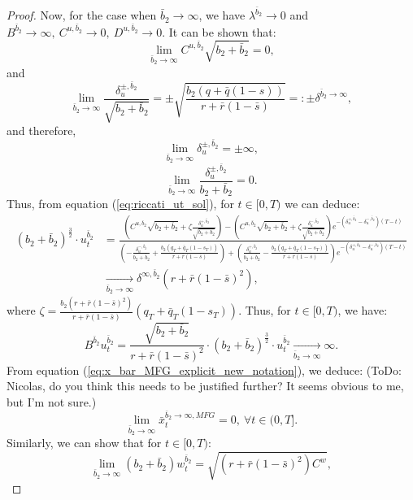 \documentclass[11pt]{article}
\begin{document}
\begin{proof}
	Now, for the case when $\bar{b}_2 \to \infty$,  we have $\lambda^{\bar{b}_2} \to 0$
	and $B^{\bar{b}_2} \to \infty,\ C^{u,\bar{b}_2} \to 0,\ D^{u,\bar{b}_2} \to 0$. It can be shown that:
	$$\lim_{\bar{b}_2 \to \infty}C^{u,\bar{b}_2}\sqrt{b_2+\bar{b}_2}=0,$$
	and
	$$ \lim_{\bar{b}_2 \to \infty} \frac{\delta^{\pm,\bar{b}_2}_u}{\sqrt{b_2 + \bar{b}_2}} =\pm \sqrt{ \frac{b_2 (q + \bar{q}(1-s))}{r + \bar{r}(1-\bar{s})} } =: \pm \delta^{\bar{b}_2 \to \infty},$$
	and therefore,
	$$\lim_{\bar{b}_2 \to \infty} \delta^{\pm,\bar{b}_2}_u=\pm \infty,$$
	$$\lim_{\bar{b}_2 \to \infty} \frac{\delta^{\pm,\bar{b}_2}_u}{b_2 + \bar{b}_2}=0.$$
	Thus, from equation (\ref{eq:riccati_ut_sol}), for $t \in [0,T)$ we can deduce:
	\begin{equation*}
	\begin{split}
	 	(b_2 + \bar{b}_2)^{\frac{3}{2}}\cdot u^{\bar{b}_2}_t &= \frac{ \left( C^{u,\bar{b}_2}\sqrt{b_2 + \bar{b}_2} + \zeta \frac{\delta^{+,\bar{b}_2}_u}{\sqrt{b_2 + \bar{b}_2}}  \right) - \left( C^{u,\bar{b}_2}\sqrt{b_2 + \bar{b}_2} + \zeta \frac{\delta^{-,\bar{b}_2}_u}{\sqrt{b_2 + \bar{b}_2}}  \right) e^{- (\delta^{+,\bar{b}_2}_u - \delta^{-,\bar{b}_2}_u)(T-t)}}{ \left(- \frac{\delta^{-,\bar{b}_2}_u}{b_2 + \bar{b}_2} + \frac{b_2 (q_T + \bar{q}_T (1-s_T) )}{r + \bar{r}(1-\bar{s})} \right) + \left( \frac{\delta^{+,\bar{b}_2}_u}{b_2 + \bar{b}_2} - \frac{b_2 (q_T + \bar{q}_T (1-s_T) )}{r + \bar{r}(1-\bar{s})} \right)e^{- (\delta^{+,\bar{b}_2}_u - \delta^{-,\bar{b}_2}_u)(T-t)} }\\
	 	& \xrightarrow[\bar{b}_2 \to \infty]{} \delta^{\infty, \bar{b}_2} (r + \bar{r}(1-\bar{s})^2) ,
	 \end{split} 
	\end{equation*}
	where $\zeta = \frac{b_2 (r + \bar{r}(1-\bar{s})^2) }{r+ \bar{r}(1-\bar{s})} (q_T + \bar{q}_T(1-s_T))$. 
	Thus, for $t \in [0,T)$, we have:
	\begin{equation*}
	B^{\bar{b}_2} u^{\bar{b}_2}_t=\frac{\sqrt{b_2+\bar{b}_2}}{r+\bar{r}(1-\bar{s})^2} \cdot (b_2 + \bar{b}_2)^{\frac{3}{2}}\cdot u^{\bar{b}_2}_t \xrightarrow[\bar{b}_2 \to \infty]{}\infty.
	\end{equation*}
	From equation (\ref{eq:x_bar_MFG_explicit_new_notation}), we deduce: (ToDo: Nicolas, do you think this needs to be justified further? It seems obvious to me, but I'm not sure.)
	$$\lim_{\bar{b}_2 \to \infty} \bar{x}_t^{\bar{b}_2 \to \infty,MFG} = 0,\ \forall t \in (0,T]. $$	
	Similarly, we can show that for $t \in [0,T)$:
	$$\lim_{\bar{b}_2 \to \infty} (b_2 + \bar{b}_2) w^{\bar{b}_2}_t = \sqrt{(r + \bar{r}(1-\bar{s})^2) C^w},$$

\end{proof}
\end{document}
